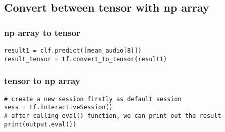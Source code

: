 \documentclass[11pt]{article}
\begin{document}
\subsection{Convert between tensor with np array}
\label{sec:orgbba1067}

\subsubsection{np array to tensor}
\label{sec:orga2c3009}

\begin{verbatim}
result1 = clf.predict([mean_audio[8]])
result_tensor = tf.convert_to_tensor(result1)
\end{verbatim}

\subsubsection{tensor to np array}
\label{sec:org41426d6}
\begin{verbatim}
# create a new session firstly as default session
sess = tf.InteractiveSession()
# after calling eval() function, we can print out the result
print(output.eval())
\end{verbatim}
\end{document}
